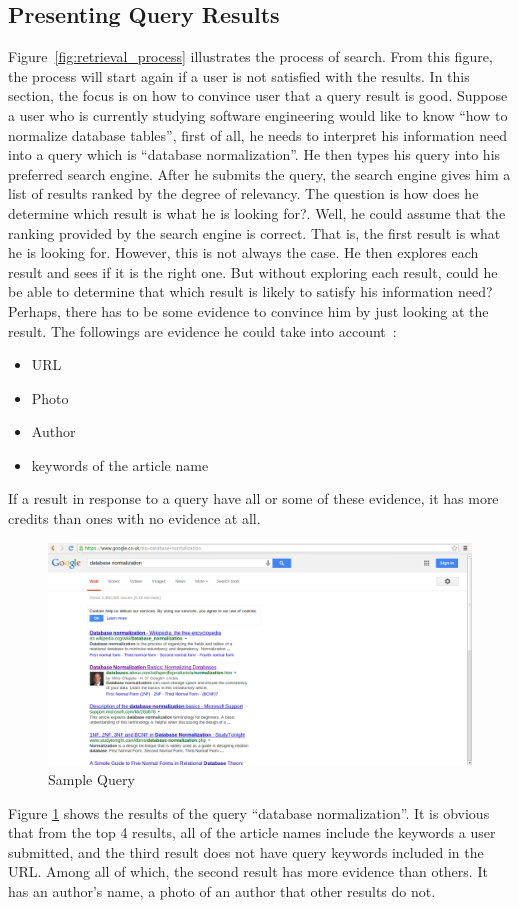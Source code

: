 \subsection{Presenting Query Results}\label{sec:presentingQueryResult}
Figure~\ref{fig:retrieval_process} illustrates the process of search. From this figure, the process will start again if a user is not satisfied with 
the results. In this section, the focus is on how to convince user that a query result is good. Suppose a user who is currently studying software engineering
would like to know ``how to normalize database tables'', first of all, he needs to interpret his information need into a query which is ``database normalization''.
He then types his query into his preferred search engine. After he submits the query, the search engine gives him a list of results ranked by the degree
of relevancy. The question is how does he determine which result is what he is looking for?. Well, he could assume that the ranking provided by the search 
engine is correct. That is, the first result is what he is looking for. However, this is not always the case. He then explores each result and sees if 
it is the right one. But without exploring each result, could he be able to determine that which result is likely to satisfy his information need?
Perhaps, there has to be some evidence to convince him by just looking at the result. The followings are evidence he could take into account~\cite{craig}: 
\begin{itemize}
 \item URL
 \item Photo
 \item Author
 \item keywords of the article name
\end{itemize}
If a result in response to a query have all or some of these evidence, it has more credits than ones with no evidence at all. 
\begin{figure}
\centering
\includegraphics[scale=0.3]{./figures/query.png}
\caption{Sample Query} \label{fig:query}
\end{figure}
Figure \ref{fig:query} shows the results of the query ``database normalization''. It is obvious that from the top 4 results, all of the article names
include the keywords a user submitted, and the third result does not have query keywords included in the URL. Among all of which, the second result has more 
evidence than others. It has an author's name, a photo of an author that other results do not.

